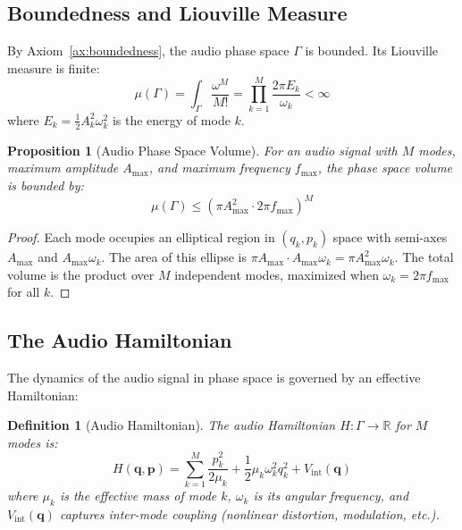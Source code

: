\documentclass[twocolumn,10pt]{article}
\newtheorem{proposition}[theorem]{Proposition}
\newtheorem{definition}[theorem]{Definition}
\theoremstyle{remark}
\begin{document}
\subsection{Boundedness and Liouville Measure}

By Axiom~\ref{ax:boundedness}, the audio phase space $\Gamma$ is bounded. Its Liouville measure is finite:
\begin{equation}
    \mu(\Gamma) = \int_\Gamma \frac{\omega^M}{M!} = \prod_{k=1}^{M} \frac{2\pi E_k}{\omega_k} < \infty
    \label{eq:liouville_measure}
\end{equation}
where $E_k = \frac{1}{2}A_k^2 \omega_k^2$ is the energy of mode $k$.

\begin{proposition}[Audio Phase Space Volume]
\label{prop:phase_volume}
For an audio signal with $M$ modes, maximum amplitude $A_{\max}$, and maximum frequency $f_{\max}$, the phase space volume is bounded by:
\begin{equation}
    \mu(\Gamma) \leq \left(\pi A_{\max}^2 \cdot 2\pi f_{\max}\right)^M
\end{equation}
\end{proposition}

\begin{proof}
Each mode occupies an elliptical region in $(q_k, p_k)$ space with semi-axes $A_{\max}$ and $A_{\max} \omega_k$. The area of this ellipse is $\pi A_{\max} \cdot A_{\max} \omega_k = \pi A_{\max}^2 \omega_k$. The total volume is the product over $M$ independent modes, maximized when $\omega_k = 2\pi f_{\max}$ for all $k$.
\end{proof}

\subsection{The Audio Hamiltonian}

The dynamics of the audio signal in phase space is governed by an effective Hamiltonian:

\begin{definition}[Audio Hamiltonian]
\label{def:audio_hamiltonian}
The audio Hamiltonian $H: \Gamma \to \mathbb{R}$ for $M$ modes is:
\begin{equation}
    H(\mathbf{q}, \mathbf{p}) = \sum_{k=1}^{M} \frac{p_k^2}{2\mu_k} + \frac{1}{2}\mu_k \omega_k^2 q_k^2 + V_{\mathrm{int}}(\mathbf{q})
    \label{eq:audio_hamiltonian}
\end{equation}
where $\mu_k$ is the effective mass of mode $k$, $\omega_k$ is its angular frequency, and $V_{\mathrm{int}}(\mathbf{q})$ captures inter-mode coupling (nonlinear distortion, modulation, etc.).
\end{definition}
\end{document}
